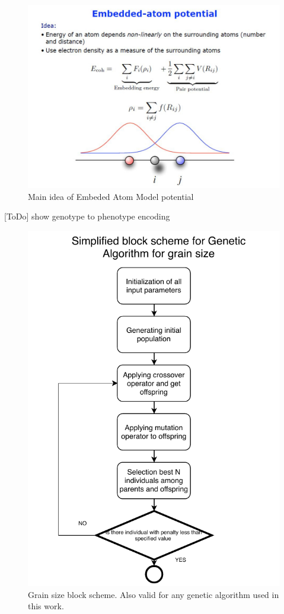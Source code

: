 \documentclass[12pt]{report}
\begin{document}
\begin{figure}
    \centering
    \includegraphics[width=5.0in]{EAM_appendix}
    \caption{Main idea of Embeded Atom Model potential}
    \label{eamappendix}
\end{figure}
[ToDo] show genotype to phenotype encoding

\begin{figure}
    \centering
    \includegraphics[width=5.0in]{grain_size_blockscheme}
    \caption{Grain size block scheme. Also valid for any genetic algorithm used in this work.}
    \label{grainsizeblock}
\end{figure}
\end{document}

